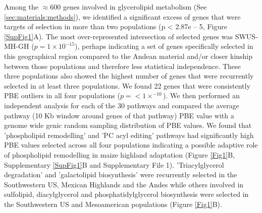 \documentclass[9pt,twocolumn,twoside,lineno]{BioRxiv}
\begin{document}
Among the $\approx 600$ genes involved in glycerolipid metabolism (See \ref{sec:materials:methods}), we identified a significant excess of genes that were targets of selection in more than two populations (p < 2.87e – 5, Figure \ref{SupFig1}A).  
The most over-represented intersection of selected genes was SWUS-MH-GH ($p = 1  \times 10 ^{-15} $), perhaps indicating a set of genes specifically selected in this geographical region compared to the Andean material and/or closer kinship between those populations and therefore less statistical independence.  
These three populations also showed the highest number of genes that were recurrently selected in at least three populations.
We found 22 genes that were consistently PBE outliers in all four populations ($p =<1  \times  ^{-10}$). 
We then performed an independent analysis for each of the 30 pathways and compared the average pathway (10 Kb window around genes of that pathway) PBE value with a genome wide genic random sampling distribution of PBE values. 
We found that 'phospholipid remodelling'  and 'PC acyl editing'  pathways had significantly high PBE values selected across all four populations indicating a possible adaptive role of phospholipid remodelling in maize highland adaptation (Figure \ref{Fig1}B, Supplementary \ref{SupFig1}B and Supplementary File 1). 
'Triacylglycerol degradation' and 'galactolipid biosynthesis' were recurrently selected in the Southwestern US, Mexican Highlands and the Andes while others involved in sulfolipid, diacylglycerol and phosphatidylglycerol biosynthesis were selected in the Southwestern US and Mesoamerican populations (Figure \ref{Fig1}B).  
\end{document}
